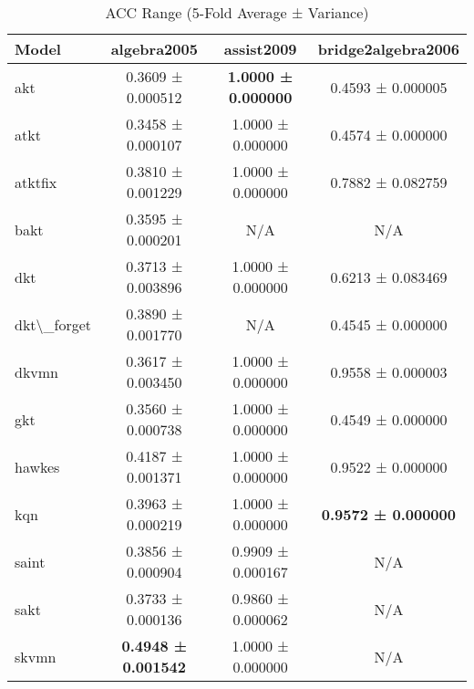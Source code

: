 \begin{table}[H]
\centering
\caption{ACC Range (5-Fold Average ± Variance)}
\label{tab:acc_range}
\begin{tabular}{lccc}
\toprule
Model & algebra2005 & assist2009 & bridge2algebra2006 \\
\midrule
akt & 0.3609 ± 0.000512 & \textbf{1.0000 ± 0.000000} & 0.4593 ± 0.000005 \\
atkt & 0.3458 ± 0.000107 & 1.0000 ± 0.000000 & 0.4574 ± 0.000000 \\
atktfix & 0.3810 ± 0.001229 & 1.0000 ± 0.000000 & 0.7882 ± 0.082759 \\
bakt & 0.3595 ± 0.000201 & N/A & N/A \\
dkt & 0.3713 ± 0.003896 & 1.0000 ± 0.000000 & 0.6213 ± 0.083469 \\
dkt\textbackslash{}_forget & 0.3890 ± 0.001770 & N/A & 0.4545 ± 0.000000 \\
dkvmn & 0.3617 ± 0.003450 & 1.0000 ± 0.000000 & 0.9558 ± 0.000003 \\
gkt & 0.3560 ± 0.000738 & 1.0000 ± 0.000000 & 0.4549 ± 0.000000 \\
hawkes & 0.4187 ± 0.001371 & 1.0000 ± 0.000000 & 0.9522 ± 0.000000 \\
kqn & 0.3963 ± 0.000219 & 1.0000 ± 0.000000 & \textbf{0.9572 ± 0.000000} \\
saint & 0.3856 ± 0.000904 & 0.9909 ± 0.000167 & N/A \\
sakt & 0.3733 ± 0.000136 & 0.9860 ± 0.000062 & N/A \\
skvmn & \textbf{0.4948 ± 0.001542} & 1.0000 ± 0.000000 & N/A \\
\bottomrule
\end{tabular}
\end{table}